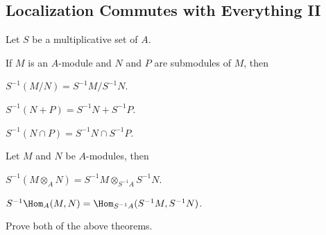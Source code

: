 \subsection{Localization Commutes with Everything II}
Let $S$ be a multiplicative set of $A$.
\begin{proposition}
    If $M$ is an $A$-module and $N$ and $P$
    are submodules of $M$, then
    \begin{alphenum}
    \item $S^{-1}(M/N) = S^{-1}M/S^{-1}N$.
    \item $S^{-1}(N+P) = S^{-1}N + S^{-1}P$.
    \item $S^{-1}(N\cap P) = S^{-1}N\cap S^{-1}P$.
    \end{alphenum}
\end{proposition}
\begin{proposition}
    \label{prop:localize_tensor_hom}
    Let $M$ and $N$ be $A$-modules, then
    \begin{alphenum}
    \item 
    $S^{-1}(M\otimes_A N) = S^{-1}M \otimes_{S^{-1}A} S^{-1}N.$
    \item $S^{-1}\Hom_A(M,N)
    = \Hom_{S^{-1}A}(S^{-1}M, S^{-1}N)$.
    \end{alphenum}
\end{proposition}
\begin{exercise}
Prove both of the above theorems.
\end{exercise}
